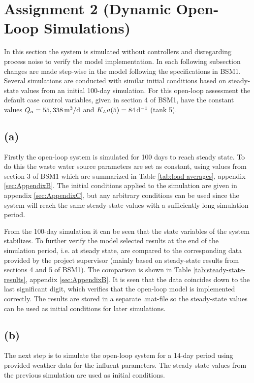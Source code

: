 \section*{Assignment 2 (Dynamic Open-Loop Simulations)}\label{sec:Assignment2}
In this section the system is simulated without controllers and disregarding process noise to verify the model implementation. In each following subsection changes are made step-wise in the model following the specifications in BSM1. Several simulations are conducted with similar initial conditions based on steady-state values from an initial 100-day simulation. For this open-loop assessment the default case control variables, given in section 4 of BSM1, have the constant values $Q_a = \unit[55,338]{m^3/d}$ and $K_La(5) = \unit[84]{d^{-1}}$ (tank 5).

\subsection*{(a)}
Firstly the open-loop system is simulated for 100 days to reach steady state. To do this the waste water source parameters are set as constant, using values from section 3 of BSM1 which are summarized in Table \ref{tab:load-averages}, appendix \ref{sec:AppendixB}. The initial conditions applied to the simulation are given in appendix \ref{sec:AppendixC}, but any arbitrary conditions can be used since the system will reach the same steady-state values with a sufficiently long simulation period.

From the 100-day simulation it can be seen that the state variables of the system stabilizes. To further verify the model selected results at the end of the simulation period, i.e. at steady state, are compared to the corresponding data provided by the project supervisor (mainly based on steady-state results from sections 4 and 5 of BSM1). The comparison is shown in Table \ref{tab:steady-state-results}, appendix \ref{sec:AppendixB}. It is seen that the data coincides down to the last significant digit, which verifies that the open-loop model is implemented correctly. The results are stored in a separate .mat-file so the steady-state values can be used as initial conditions for later simulations. %

\subsection*{(b)}
The next step is to simulate the open-loop system for a 14-day period using provided weather data for the influent parameters. The steady-state values from the previous simulation are used as initial conditions. 

